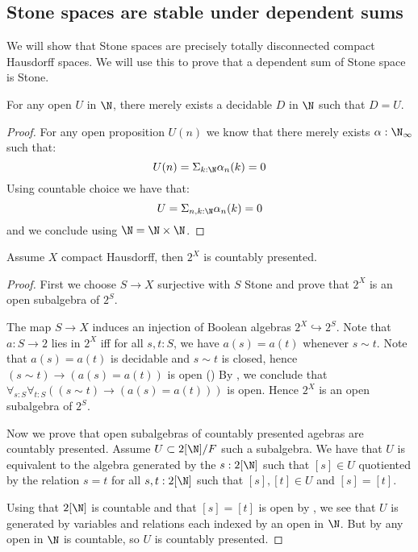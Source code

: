 \subsection{Stone spaces are stable under dependent sums}

We will show that Stone spaces are precisely totally disconnected compact Hausdorff spaces. We will use this to prove that a dependent sum of Stone space is Stone.

\begin{lemma}\label{OpenInNAreDecidableInN}
For any open $U$ in $\N$, there merely exists a decidable $D$ in $\N$ such that $D=U$.
\end{lemma}

\begin{proof}
For any open proposition $U(n)$ we know that there merely exists $\alpha:\N_\infty$ such that:
$$ U(n) = \Sigma_{k:\N}\alpha_n(k)=0$$
Using countable choice we have that:
$$ U = \Sigma_{n,k:\N}\alpha_n(k)=0$$
and we conclude using $\N=\N\times\N$.
\end{proof}

\begin{lemma}\label{AlgebraCompactHausdorffCountablyPresented}
Assume $X$ compact Hausdorff, then $2^X$ is countably presented.
\end{lemma}

\begin{proof}
First we choose $S\to X$ surjective with $S$ Stone and prove that $2^X$ is an open subalgebra of $2^S$.

 The map $S\to X$ induces an injection of Boolean algebras $2^X \hookrightarrow 2^S$.
  Note that $a:S\to 2$ lies in $2^X$ iff for all $s,t:S$, we have $a(s) = a(t)$ whenever $s\sim t$.
  Note that $a(s) = a(t)$ is decidable and $s\sim t$ is closed, hence 
  $(s\sim t) \to (a(s) = a(t))$ is open ()
  By , we conclude that 
  $\forall_{s:S} \forall_{t:S} ((s\sim t) \to (a(s) = a(t)))$ is open. 
  Hence $2^X$ is an open subalgebra of $2^S$. 

Now we prove that open subalgebras of countably presented agebras are countably presented. Assume $U\subset 2[\N] / F$ such a subalgebra. We have that $U$ is equivalent to the algebra generated by the $s:2[\N]$ such that $[s]\in U$ quotiented by the relation $s=t$ for all $s,t:2[\N]$ such that $[s],[t]\in U$ and $[s]=[t]$.

Using that $2[\N]$ is countable and that $[s]=[t]$ is open by , we see that $U$ is generated by variables and relations each indexed by an open in $\N$. But by  any open in $\N$ is countable, so $U$ is countably presented.
\end{proof}


